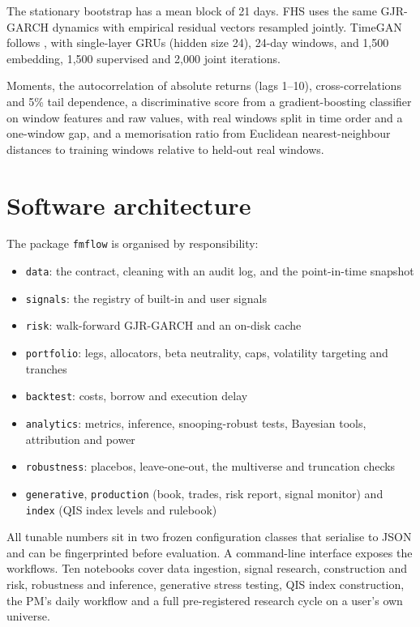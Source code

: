  The stationary bootstrap has a mean block of 21 days. FHS uses the same GJR-GARCH dynamics with empirical residual vectors resampled jointly. TimeGAN follows \citet{yoon2019}, with single-layer GRUs (hidden size 24), 24-day windows, and 1,500 embedding, 1,500 supervised and 2,000 joint iterations.

 Moments, the autocorrelation of absolute returns (lags 1--10), cross-correlations and 5\% tail dependence, a discriminative score from a gradient-boosting classifier on window features and raw values, with real windows split in time order and a one-window gap, and a memorisation ratio from Euclidean nearest-neighbour distances to training windows relative to held-out real windows.

\section{Software architecture}

The package \texttt{fmflow} is organised by responsibility:
\begin{itemize}
  \item \texttt{data}: the contract, cleaning with an audit log, and the point-in-time snapshot
  \item \texttt{signals}: the registry of built-in and user signals
  \item \texttt{risk}: walk-forward GJR-GARCH and an on-disk cache
  \item \texttt{portfolio}: legs, allocators, beta neutrality, caps, volatility targeting and tranches
  \item \texttt{backtest}: costs, borrow and execution delay
  \item \texttt{analytics}: metrics, inference, snooping-robust tests, Bayesian tools, attribution and power
  \item \texttt{robustness}: placebos, leave-one-out, the multiverse and truncation checks
  \item \texttt{generative}, \texttt{production} (book, trades, risk report, signal monitor) and \texttt{index} (QIS index levels and rulebook)
\end{itemize}
All tunable numbers sit in two frozen configuration classes that serialise to JSON and can be fingerprinted before evaluation. A command-line interface exposes the workflows. Ten notebooks cover data ingestion, signal research, construction and risk, robustness and inference, generative stress testing, QIS index construction, the PM's daily workflow and a full pre-registered research cycle on a user's own universe.

